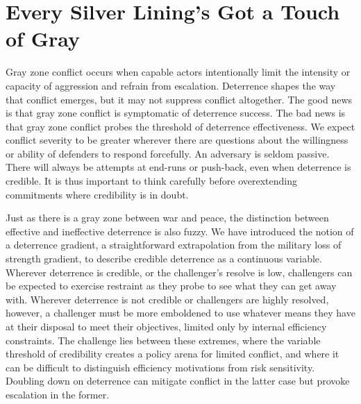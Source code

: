\documentclass[bibtex, autowc]{apsr_submission}
\begin{document}
\section{Every Silver Lining's Got a Touch of Gray}
Gray zone conflict occurs when capable actors intentionally limit the intensity or capacity of aggression and refrain from escalation. Deterrence shapes the way that conflict emerges, but it may not suppress conflict altogether. The good news is that gray zone conflict is symptomatic of deterrence success. The bad news is that gray zone conflict probes the threshold of deterrence effectiveness. We expect conflict severity to be greater wherever there are questions about the willingness or ability of defenders to respond forcefully. An adversary is seldom passive. There will always be attempts at end-runs or push-back, even when deterrence is credible. It is thus important to think carefully before overextending commitments where credibility is in doubt. 

Just as there is a gray zone between war and peace, the distinction between effective and ineffective deterrence is also fuzzy. We have introduced the notion of a deterrence gradient, a straightforward extrapolation from the military loss of strength gradient, to describe credible deterrence as a continuous variable. Wherever deterrence is credible, or the challenger's resolve is low, challengers can be expected to exercise restraint as they probe to see what they can get away with. Wherever deterrence is not credible or challengers are highly resolved, however, a challenger must be more emboldened to use whatever means they have at their disposal to meet their objectives, limited only by internal efficiency constraints. The challenge lies between these extremes, where the variable threshold of credibility creates a policy arena for limited conflict, and where it can be difficult to distinguish efficiency motivations from risk sensitivity. Doubling down on deterrence can mitigate conflict in the latter case but provoke escalation in the former.
\end{document}

